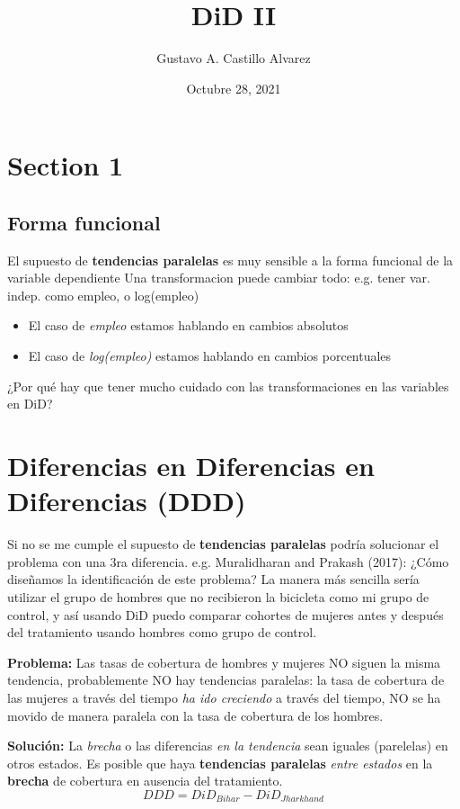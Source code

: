 \documentclass[11pt, twocolumn]{article}
\title{DiD II}
\author{Gustavo A. Castillo Alvarez}
\date{Octubre 28, 2021}
\begin{document}
\maketitle	



\section{Section 1}
\subsection{Forma funcional}
El supuesto de \textbf{tendencias paralelas} es muy sensible a la forma funcional de la variable dependiente
Una transformacion puede cambiar todo: e.g. tener var. indep. como empleo, o log(empleo)
\begin{itemize}
    \item  El caso de \textit{empleo} estamos hablando en cambios absolutos
    \item El caso de \textit{log(empleo)} estamos hablando en cambios porcentuales
\end{itemize}
¿Por qué hay que tener mucho cuidado con las transformaciones en las variables en DiD?


\section{Diferencias en Diferencias en Diferencias (DDD)}
Si no se me cumple el supuesto de \textbf{tendencias paralelas} podría solucionar el problema con una 3ra diferencia.
e.g. Muralidharan and Prakash (2017): ¿Cómo diseñamos la identificación de este problema? La manera más sencilla sería utilizar el grupo de hombres que no recibieron la bicicleta como mi grupo de control, y así usando DiD puedo comparar cohortes de mujeres antes y después del tratamiento usando hombres como grupo de control.

\textbf{Problema:} Las tasas de cobertura de hombres y mujeres NO siguen la misma tendencia, probablemente NO hay tendencias paralelas: la tasa de cobertura de las mujeres a través del tiempo \textit{ha ido creciendo} a través del tiempo, NO se ha movido de manera paralela con la tasa de cobertura de los hombres.

\textbf{Solución:} La \textit{brecha} o las diferencias \textit{en la tendencia} sean iguales (parelelas) en otros estados.
Es posible que haya \textbf{tendencias paralelas} \textit{entre estados} en la \textbf{brecha} de cobertura en ausencia del tratamiento.
\[
DDD=DiD_{Bihar}-DiD_{Jharkhand}
\]
\end{document}
